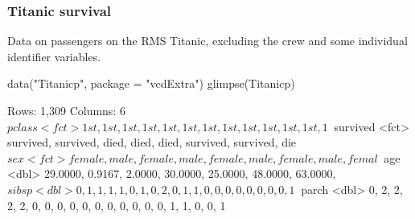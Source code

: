 \documentclass[a4paper]{article}
\begin{document}
\subsubsection{Titanic survival}
Data on passengers on the RMS Titanic, excluding the crew and some individual identifier variables.
\begin{Schunk}
\begin{Sinput}
data("Titanicp", package = "vcdExtra")
glimpse(Titanicp)
\end{Sinput}
\begin{Soutput}
Rows: 1,309
Columns: 6
$ pclass   <fct> 1st, 1st, 1st, 1st, 1st, 1st, 1st, 1st, 1st, 1st, 1st, 1st, 1~
$ survived <fct> survived, survived, died, died, died, survived, survived, die~
$ sex      <fct> female, male, female, male, female, male, female, male, femal~
$ age      <dbl> 29.0000, 0.9167, 2.0000, 30.0000, 25.0000, 48.0000, 63.0000, ~
$ sibsp    <dbl> 0, 1, 1, 1, 1, 0, 1, 0, 2, 0, 1, 1, 0, 0, 0, 0, 0, 0, 0, 0, 1~
$ parch    <dbl> 0, 2, 2, 2, 2, 0, 0, 0, 0, 0, 0, 0, 0, 0, 0, 0, 1, 1, 0, 0, 1~
\end{Soutput}
\end{Schunk}
\end{document}
